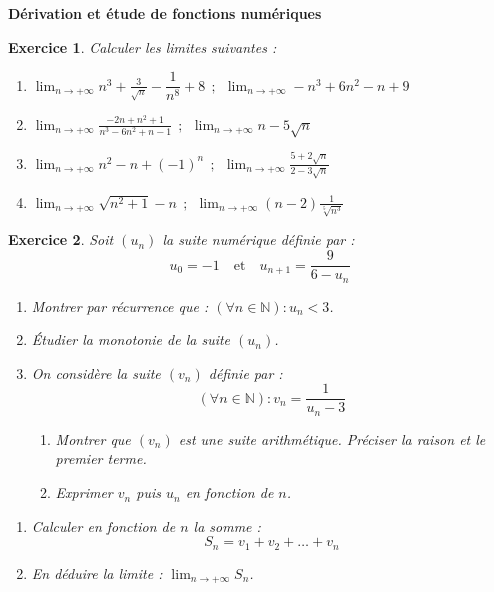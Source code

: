 \documentclass[12pt,a4paper]{article}
\newcommand{\Lim}{\displaystyle\lim}
\theoremstyle{mystyle}
\newtheorem{exo}{Exercice}
\begin{document}
\pagestyle{fancy}
\fancyhf{} %
\fancyfoot[C]{\thepage} %


\begin{center}
    \textbf{\Large Dérivation et étude de fonctions numériques}
\end{center}
\begin{multicols*}{2}

\begin{exo}
Calculer les limites suivantes :
\begin{enumerate}
	\item $\Lim_{n \to +\infty} n^3 + \frac{3}{\sqrt{n}} - \dfrac{1}{n^8} + 8 \ \ ; \ \ \Lim_{n \to +\infty} -n^3 + 6n^2 - n + 9$
	\item $\Lim_{n \to +\infty} \frac{-2n + n^2 + 1}{n^3 - 6n^2 + n - 1} \ \ ; \ \ \Lim_{n \to +\infty} n - 5\sqrt{n}$
	\item $\Lim_{n \to +\infty} n^2 - n + (-1)^n \ \ ; \ \ \Lim_{n \to +\infty} \frac{5 +2\sqrt{n}}{2 - 3\sqrt{n}}$
	\item $\Lim_{n \to +\infty} \sqrt{n^2 + 1} - n \ \ ; \ \ \Lim_{n \to +\infty} (n - 2) \frac{1}{\sqrt[5]{n^3}}$
\end{enumerate}
\end{exo}

\begin{exo}
Soit \( (u_n) \) la suite numérique définie par :
\[
u_0 = -1 \quad \text{et} \quad u_{n+1} = \frac{9}{6 - u_n}
\]
\begin{enumerate}
	\item Montrer par récurrence que : \( (\forall n \in \mathbb{N}) : u_n < 3 \).
	\item Étudier la monotonie de la suite \( (u_n) \).
	\item On considère la suite \( (v_n) \) définie par :
$$(\forall n \in \mathbb{N}) : v_n = \frac{1}{u_n - 3}$$
		\begin{enumerate}
			\item Montrer que \( (v_n) \) est une suite arithmétique. Préciser la raison et le premier terme.
			\item Exprimer \( v_n \) puis \( u_n \) en fonction de \( n \).
		\end{enumerate}
\end{enumerate}
	\item
		\begin{enumerate}
			\item  Calculer en fonction de \( n \) la somme : $$S_n = v_1 + v_2 + \ldots + v_n$$
			\item En déduire la limite : \( \Lim_{n \to +\infty} S_n \).
		\end{enumerate}
\end{exo}


\end{multicols*}
\end{document}
